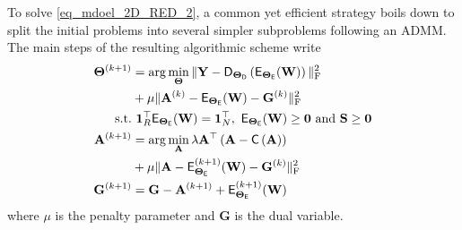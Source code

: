 \documentclass[journal,a4paper]{IEEEtran}
\newcommand{\bfY}{\mathbf{Y}}
\newcommand{\bTheta}{\boldsymbol{\Theta}}
\newcommand{\MATabund}{\mathbf{A}}
\newcommand{\MATend}{\mathbf{S}}
\begin{document}
To solve  \eqref{eq_mdoel_2D_RED_2}, a common yet efficient strategy boils down to split the initial problems into several simpler subproblems following an ADMM. The main steps of the resulting algorithmic scheme write
\begin{align}
\bTheta^{(k+1)}&=\arg\min_{\bTheta}\|\bfY-\mathsf{D}_{\bTheta_{\sf D}}\left(\mathsf{E}_{\bTheta_{\sf E}}(\mathbf{W})\right)\|_{\text{F}}^2  \label{eq_mdoel_2D_RED_T} \\
               &+\mu\|\MATabund^{(k)}-\mathsf{E}_{\bTheta_{\sf E}}(\mathbf{W})-\mathbf{G}^{(k)}\|_{\text{F}}^{2} \nonumber \\
  \text{s.t.}  &\ \boldsymbol{1}^{\top}_{R}\mathsf{E}_{\bTheta_{\sf E}}(\mathbf{W})=\boldsymbol{1}_{N}^{\top},~ 
                    \mathsf{E}_{\bTheta_{\sf E}}(\mathbf{W})\geq \boldsymbol{0}~\text{and}~\MATend\geq \boldsymbol{0} \nonumber\\
\mathbf{A}^{(k+1)}&= \arg\min_{\MATabund}\lambda \MATabund^\top\left(\MATabund-\mathsf{C}\left(\MATabund\right)\right)  \label{eq_mdoel_2D_RED_A} \\
               &+\mu\|\MATabund-\mathsf{E}_{\bTheta_{\sf E}}^{(k+1)}(\mathbf{W})-\mathbf{G}^{(k)}\|_{\text{F}}^{2} \nonumber \\
\mathbf{G}^{(k+1)}&=\mathbf{G}-\MATabund^{(k+1)}+\mathsf{E}_{\bTheta_{\sf E}}^{(k+1)}(\mathbf{W}) \label{eq_mdoel_2D_RED_g} 
\end{align}
where  $\mu$ is the penalty parameter and $\mathbf{G}$ is the dual variable.
\end{document}

